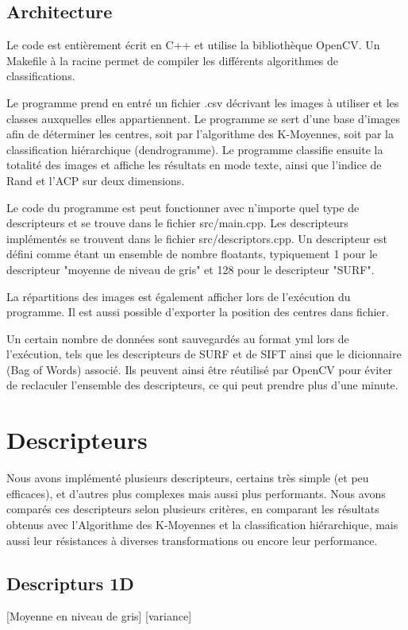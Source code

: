 \documentclass[12pt,a4paper,utf8x]{report}
\begin{document}
\section{Architecture}
    Le code est entièrement écrit en C++ et utilise la bibliothèque OpenCV. Un Makefile à la racine permet de compiler les différents algorithmes de classifications.

    Le programme prend en entré un fichier .csv décrivant les images à utiliser et les classes auxquelles elles appartiennent. Le programme se sert d'une base d'images afin de déterminer les centres, soit par l'algorithme des K-Moyennes, soit par la classification hiérarchique (dendrogramme). Le programme classifie ensuite la totalité des images et affiche les résultats en mode texte, ainsi que l'indice de Rand et l'ACP sur deux dimensions.

    Le code du programme est peut fonctionner avec n'importe quel type de descripteurs et se trouve dans le fichier src/main.cpp. Les descripteurs implémentés se trouvent dans le fichier src/descriptors.cpp. Un descripteur est défini comme étant un ensemble de nombre floatants, typiquement 1 pour le descripteur "moyenne de niveau de gris" et 128 pour le descripteur "SURF".

    La répartitions des images est également afficher lors de l'exécution du programme. Il est aussi possible d'exporter la position des centres dans fichier.

    Un certain nombre de données sont sauvegardés au format yml lors de l'exécution, tels que les descripteurs de SURF et de SIFT ainsi que le dicionnaire (Bag of Words) associé. Ils peuvent ainsi être réutilisé par OpenCV pour éviter de reclaculer l'ensemble des descripteurs, ce qui peut prendre plus d'une minute.


\chapter{Descripteurs}
    Nous avons implémenté plusieurs descripteurs, certains très simple (et peu efficaces), et d'autres plus complexes mais aussi plus performants. Nous avons comparés ces descripteurs selon plusieurs critères, en comparant les résultats obtenus avec l'Algorithme des K-Moyennes et la classification hiérarchique, mais aussi leur résistances à diverses transformations ou encore leur performance.

    \section{Descripturs 1D}
        [Moyenne en niveau de gris]
        [variance]
\end{document}
